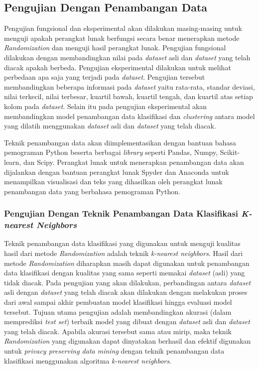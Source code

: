 \subsection{Pengujian Dengan Penambangan Data}
\label{subsec:analisis-penambangan}

Pengujian fungsional dan eksperimental akan dilakukan masing-masing untuk menguji apakah perangkat lunak berfungsi secara benar menerapkan metode \textit{Randomization} dan menguji hasil perangkat lunak. Pengujian fungsional dilakukan dengan membandingkan nilai pada \textit{dataset} asli dan \textit{dataset} yang telah diacak apakah berbeda. Pengujian eksperimental dilakukan untuk melihat perbedaan apa saja yang terjadi pada \textit{dataset}. Pengujian tersebut membandingkan beberapa informasi pada \textit{dataset} yaitu rata-rata, standar deviasi, nilai terkecil, nilai terbesar, kuartil bawah, kuartil tengah, dan kuartil atas setiap kolom pada \textit{dataset}. Selain itu pada pengujian eksperimental akan membandingkan model penambangan data klasifikasi dan \textit{clustering} antara model yang dilatih menggunakan \textit{dataset} asli dan \textit{dataset} yang telah diacak.

Teknik penambangan data akan diimplementasikan dengan bantuan bahasa pemograman Python beserta berbagai \textit{library} seperti Pandas, Numpy, Scikit-learn, dan Scipy. Perangkat lunak untuk menerapkan penambangan data akan dijalankan dengan bantuan perangkat lunak Spyder dan Anaconda untuk menampilkan visualisasi dan teks yang dihasilkan oleh perangkat lunak penambangan data yang berbahasa pemograman Python. 

\subsubsection{Pengujian Dengan Teknik Penambangan Data Klasifikasi \textit{K-nearest Neighbors}}
\label{subsubsec:analisis-knn}

Teknik penambangan data klasifikasi yang digunakan untuk menguji kualitas hasil dari metode \textit{Randomization} adalah teknik \textit{k-nearest neighbors}. Hasil dari metode \textit{Randomization} diharapkan masih dapat digunakan untuk penambangan data klasifikasi dengan kualitas yang sama seperti memakai \textit{dataset} (asli) yang tidak diacak. Pada pengujian yang akan dilakukan, perbandingan antara \textit{dataset} asli dengan \textit{dataset} yang telah diacak akan dilakukan dengan melakukan proses dari awal sampai akhir pembuatan model klasifikasi hingga evaluasi model tersebut. Tujuan utama pengujian adalah membandingkan akurasi (dalam memprediksi \textit{test set}) terbaik model yang dibuat dengan \textit{dataset} asli dan \textit{dataset} yang telah diacak. Apabila akurasi tersebut sama atau mirip, maka teknik \textit{Randomization} yang digunakan dapat dinyatakan berhasil dan efektif digunakan untuk \textit{privacy preserving data mining} dengan teknik penambangan data klasifikasi menggunakan algoritma \textit{k-nearest neighbors}.

